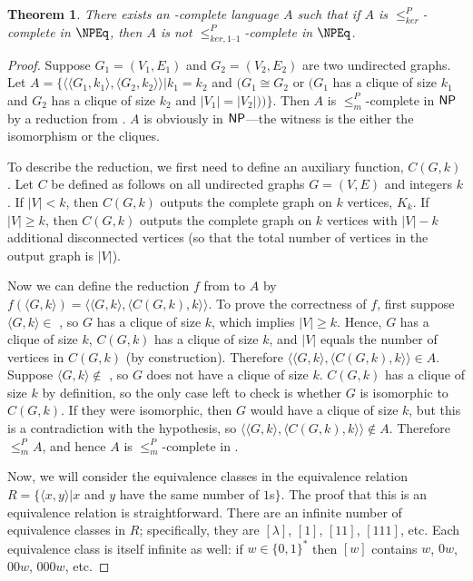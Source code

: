 \documentclass[draft]{article}
\newtheorem{theorem}{Theorem}[section]
\theoremstyle{definition} \newtheorem{openproblem}[openproblem]{Open problem}
\theoremstyle{definition} \newtheorem{definition}[definition]{Definition}
\newcommand{\sigmastar}{\{0, 1\}^{*}} %
\newcommand{\kr}{\leq^{P}_{ker}} %
\newcommand{\kri}{\leq^{P}_{ker,1\text{--}1}} %
\newcommand{\mor}{\leq^{P}_{m}} %
\newcommand{\pair}[2]{\langle#1,#2\rangle} %
\begin{document}
\begin{theorem}
  There exists an \NP-complete language $A$ such that if $A$ is $\kr$-complete
  in $\NPEq$, then $A$ is not $\kri$-complete in $\NPEq$.
\end{theorem}
\begin{proof}
  Suppose $G_1=(V_1, E_1)$ and $G_2=(V_2, E_2)$ are two undirected graphs.
  Let $A=\{\pair{\pair{G_1}{k_1}}{\pair{G_2}{k_2}}| k_1=k_2$ and $(G_1\cong G_2$ or $(G_1$ has a clique of size $k_1$ and $G_2$ has a clique of size $k_2$ and $|V_1|=|V_2|))\}$.
  Then $A$ is $\mor$-complete in ${\mathsf{NP}}$ by a reduction from .
  $A$ is obviously in ${\mathsf{NP}}$---the witness is the either the isomorphism or the cliques.
  
  To describe the reduction, we first need to define an auxiliary function, $C(G, k)$.
  Let $C$ be defined as follows on all undirected graphs $G=(V, E)$ and integers $k$.
  If $|V| < k$, then $C(G, k)$ outputs the complete graph on $k$ vertices, $K_k$.
  If $|V|\geq k$, then $C(G, k)$ outputs the complete graph on $k$ vertices with $|V|-k$ additional disconnected vertices (so that the total number of vertices in the output graph is $|V|$).

  Now we can define the reduction $f$ from  to $A$ by $f(\pair{G}{k})=\pair{\pair{G}{k}}{\pair{C(G, k)}{k}}$.
  To prove the correctness of $f$, first suppose $\pair{G}{k}\in$ , so $G$ has a clique of size $k$, which implies $|V|\geq k$.
  Hence, $G$ has a clique of size $k$, $C(G, k)$ has a clique of size $k$, and $|V|$ equals the number of vertices in $C(G, k)$ (by construction).
  Therefore $\pair{\pair{G}{k}}{\pair{C(G, k)}{k}}\in A$.
  Suppose $\pair{G}{k}\notin$ , so $G$ does not have a clique of size $k$.
  $C(G, k)$ has a clique of size $k$ by definition, so the only case left to check is whether $G$ is isomorphic to $C(G, k)$.
  If they were isomorphic, then $G$ would have a clique of size $k$, but this is a contradiction with the hypothesis, so $\pair{\pair{G}{k}}{\pair{C(G, k)}{k}}\notin A$.
  Therefore $\mor A$, and hence $A$ is $\mor$-complete in \NP.

  Now, we will consider the equivalence classes in the equivalence relation $R=\{\pair{x}{y}|x$ and $y$ have the same number of $1$s$\}$.
  The proof that this is an equivalence relation is straightforward.
  There are an infinite number of equivalence classes in $R$; specifically, they are $[\lambda]$, $[1]$, $[11]$, $[111]$, etc.
  Each equivalence class is itself infinite as well: if $w\in\sigmastar$ then $[w]$ contains $w$, $0w$, $00w$, $000w$, etc.


\end{proof}
\end{document}
